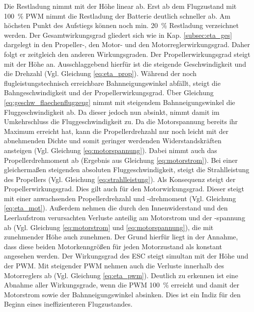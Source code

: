Die Restladung nimmt mit der Höhe linear ab. Erst ab dem Flugzustand mit \SI{100}{\%} PWM nimmt die Restladung der Batterie deutlich schneller ab. Am höchsten Punkt des Aufstiegs können noch min. \SI{20}{\%} Restladung verzeichnet werden.
Der Gesamtwirkungsgrad gliedert sich wie in Kap. \ref{subsec:eta_ges} dargelegt in den Propeller-, den Motor- und den Motorreglerwirkungsgrad. Daher folgt er zeitgleich den anderen Wirkungsgraden. Der Propellerwirkungsgrad steigt mit der Höhe an. Ausschlaggebend hierfür ist die steigende Geschwindigkeit und die Drehzahl (Vgl. Gleichung \ref{eq:eta_prop}). Während der noch flugleistungstechnisch erreichbare Bahnneigungswinkel abfällt, steigt die Bahngeschwindigkeit und der Propellerwirkungsgrad. Über Gleichung \ref{eq:geschw_flaechenflugzeug} nimmt mit steigendem Bahnneigungswinkel die Fluggeschwindigkeit ab. Da dieser jedoch nun absinkt, nimmt damit im Umkehrschluss die Fluggeschwindigkeit zu. Da die Motorspannung bereits ihr Maximum erreicht hat, kann die Propellerdrehzahl nur noch leicht mit der abnehmenden Dichte und somit geringer werdenden Widerstandskräften ansteigen (Vgl. Gleichung \ref{eq:motorspannung}). Dabei nimmt auch das Propellerdrehmoment ab (Ergebnis aus Gleichung \ref{eq:motorstrom}). Bei einer gleichermaßen steigenden absoluten Fluggeschwindigkeit, steigt die Strahlleistung des Propellers (Vgl. Gleichung \ref{eq:strahlleistung}). Als Konsequenz steigt der Propellerwirkungsgrad.
Dies gilt auch für den Motorwirkungsgrad. Dieser steigt mit einer anwachsenden Propellerdrehzahl und -drehmoment (Vgl. Gleichung \ref{eq:eta_mot}). Außerdem nehmen die durch den Innenwiderstand und den Leerlaufstrom verursachten Verluste anteilig am Motorstrom und der -spannung ab (Vgl. Gleichung \ref{eq:motorstrom} und \ref{eq:motorspannung}), die mit zunehmender Höhe auch zunehmen. Der Grund hierfür liegt in der Annahme, dass diese beiden Motorkenngrößen für jeden Motorzustand als konstant angesehen werden. Der Wirkungsgrad des ESC steigt simultan mit der Höhe und der PWM. Mit steigender PWM nehmen auch die Verluste innerhalb des Motorreglers ab (Vgl. Gleichung \ref{eq:eta_pwm}). Deutlich zu erkennen ist eine Abnahme aller Wirkungsgrade, wenn die PWM \SI{100}{\%} erreicht und damit der Motorstrom sowie der Bahnneigungswinkel absinken. Dies ist ein Indiz für den Beginn eines ineffizienteren Flugzustandes.



